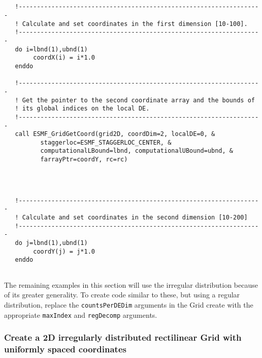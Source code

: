 
 \begin{verbatim}


   !-------------------------------------------------------------------
   ! Calculate and set coordinates in the first dimension [10-100].
   !-------------------------------------------------------------------
   do i=lbnd(1),ubnd(1)
        coordX(i) = i*1.0
   enddo

   !-------------------------------------------------------------------
   ! Get the pointer to the second coordinate array and the bounds of
   ! its global indices on the local DE.
   !-------------------------------------------------------------------
   call ESMF_GridGetCoord(grid2D, coordDim=2, localDE=0, &
          staggerloc=ESMF_STAGGERLOC_CENTER, &
          computationalLBound=lbnd, computationalUBound=ubnd, &
          farrayPtr=coordY, rc=rc)
 
\end{verbatim}
 

 \begin{verbatim}


   !-------------------------------------------------------------------
   ! Calculate and set coordinates in the second dimension [10-200]
   !-------------------------------------------------------------------
   do j=lbnd(1),ubnd(1)
        coordY(j) = j*1.0
   enddo
 
\end{verbatim}
 

  
   The remaining examples in this section will use the irregular
   distribution because of its greater generality. To create code similar to these, but
   using a regular distribution, replace the {\tt countsPerDEDim} arguments
   in the Grid create with the appropriate {\tt maxIndex} and {\tt regDecomp} arguments.
  
  \subsubsection{Create a 2D irregularly distributed rectilinear Grid
                    with uniformly spaced coordinates}
   \label{example:2DIrregUniGrid}
  
